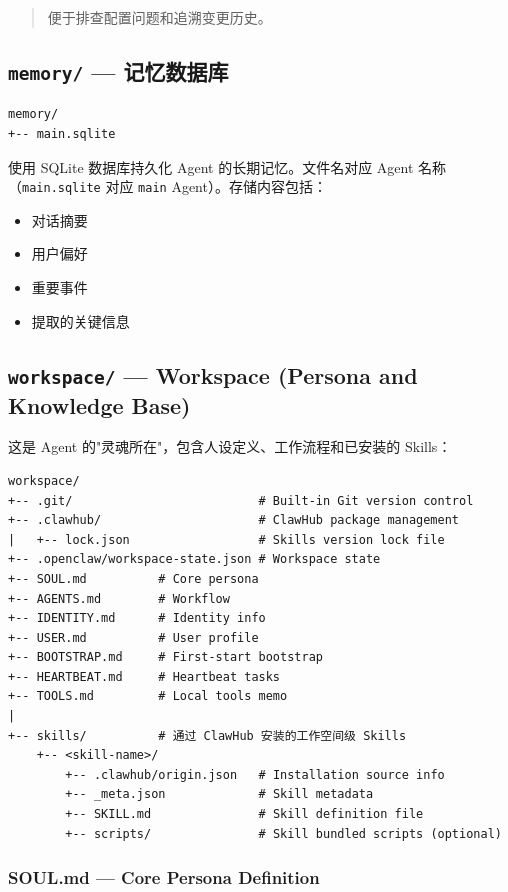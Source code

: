 \begin{quote}
便于排查配置问题和追溯变更历史。
\end{quote}

\subsection{\texttt{memory/} --- 记忆数据库}


\begin{lstlisting}
memory/
+-- main.sqlite
\end{lstlisting}

使用 SQLite 数据库持久化 Agent 的长期记忆。文件名对应 Agent 名称（\texttt{main.sqlite} 对应 \texttt{main} Agent）。存储内容包括：

\begin{itemize}
  \item 对话摘要
  \item 用户偏好
  \item 重要事件
  \item 提取的关键信息
\end{itemize}

\subsection{\texttt{workspace/} --- Workspace (Persona and Knowledge Base)}


这是 Agent 的"灵魂所在"，包含人设定义、工作流程和已安装的 Skills：

\begin{lstlisting}
workspace/
+-- .git/                          # Built-in Git version control
+-- .clawhub/                      # ClawHub package management
|   +-- lock.json                  # Skills version lock file
+-- .openclaw/workspace-state.json # Workspace state
+-- SOUL.md          # Core persona
+-- AGENTS.md        # Workflow
+-- IDENTITY.md      # Identity info
+-- USER.md          # User profile
+-- BOOTSTRAP.md     # First-start bootstrap
+-- HEARTBEAT.md     # Heartbeat tasks
+-- TOOLS.md         # Local tools memo
|
+-- skills/          # 通过 ClawHub 安装的工作空间级 Skills
    +-- <skill-name>/
        +-- .clawhub/origin.json   # Installation source info
        +-- _meta.json             # Skill metadata
        +-- SKILL.md               # Skill definition file
        +-- scripts/               # Skill bundled scripts (optional)
\end{lstlisting}

\subsubsection{SOUL.md --- Core Persona Definition}


